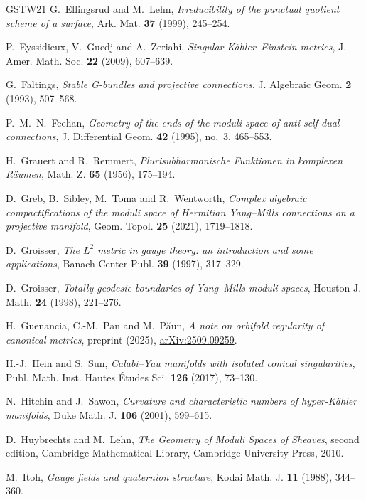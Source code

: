 \begin{thebibliography}{GSTW21}
G.~Ellingsrud and M.~Lehn,
\emph{Irreducibility of the punctual quotient scheme of a surface},
Ark. Mat. \textbf{37} (1999), 245--254.

P.~Eyssidieux, V.~Guedj and A.~Zeriahi,
\emph{Singular K\"ahler--Einstein metrics},
J. Amer. Math. Soc. \textbf{22} (2009), 607--639.

G.~Faltings,
\emph{Stable G-bundles and projective connections},
J. Algebraic Geom. \textbf{2} (1993), 507--568.

P.~M.~N.~Feehan,
\emph{Geometry of the ends of the moduli space of anti-self-dual connections},
J. Differential Geom. \textbf{42} (1995), no.~3, 465--553.

H.~Grauert and R.~Remmert,
\emph{Plurisubharmonische Funktionen in komplexen R\"aumen},
Math. Z. \textbf{65} (1956), 175--194.

D.~Greb, B.~Sibley, M.~Toma and R.~Wentworth,
\emph{Complex algebraic compactifications of the moduli space of
Hermitian Yang--Mills connections on a projective manifold},
Geom. Topol. \textbf{25} (2021), 1719--1818.

D.~Groisser,
\emph{The $L^2$ metric in gauge theory: an introduction and some applications},
Banach Center Publ. \textbf{39} (1997), 317--329.

D.~Groisser,
\emph{Totally geodesic boundaries of Yang--Mills moduli spaces},
Houston J. Math. \textbf{24} (1998), 221--276.

H.~Guenancia, C.-M.~Pan and M.~P\u aun,
\emph{A note on orbifold regularity of canonical metrics},
preprint (2025), \href{https://arxiv.org/abs/2509.09259}{arXiv:2509.09259}.

H.-J.~Hein and S.~Sun,
\emph{Calabi--Yau manifolds with isolated conical singularities},
Publ. Math. Inst. Hautes \'Etudes Sci. \textbf{126} (2017), 73--130.

N.~Hitchin and J.~Sawon,
\emph{Curvature and characteristic numbers of hyper-K\"ahler manifolds},
Duke Math. J. \textbf{106} (2001), 599--615.

D.~Huybrechts and M.~Lehn,
\emph{The Geometry of Moduli Spaces of Sheaves}, second edition,
Cambridge Mathematical Library, Cambridge University Press, 2010.

M.~Itoh,
\emph{Gauge fields and quaternion structure},
Kodai Math. J. \textbf{11} (1988), 344--360.


\end{thebibliography}
